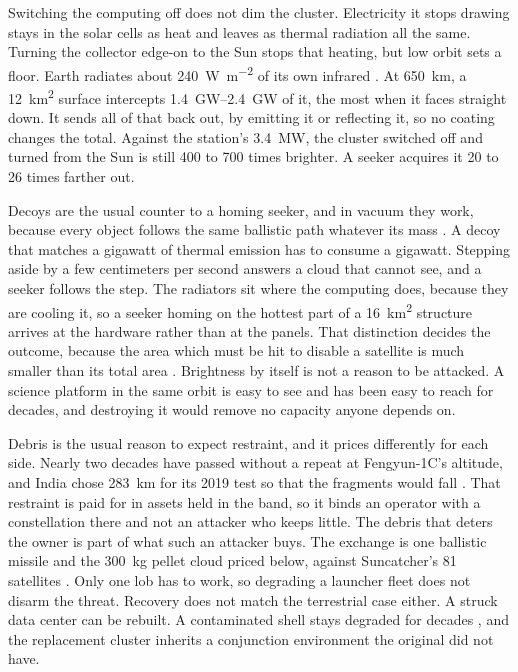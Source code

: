 \documentclass{article}
\begin{document}
Switching the computing off does not dim the cluster. Electricity it stops drawing stays in the solar cells as heat and leaves as thermal radiation all the same. Turning the collector edge-on to the Sun stops that heating, but low orbit sets a floor. Earth radiates about \SI{240}{\watt\per\square\meter} of its own infrared \cite{trenberth2009earth}. At \SI{650}{\kilo\meter}, a \SI{12}{\kilo\meter\squared} surface intercepts \SIrange{1.4}{2.4}{\giga\watt} of it, the most when it faces straight down. It sends all of that back out, by emitting it or reflecting it, so no coating changes the total. Against the station's \SI{3.4}{\mega\watt}, the cluster switched off and turned from the Sun is still 400 to 700 times brighter. A seeker acquires it 20 to 26 times farther out.

Decoys are the usual counter to a homing seeker, and in vacuum they work, because every object follows the same ballistic path whatever its mass \cite{nrc2012_bmd}. A decoy that matches a gigawatt of thermal emission has to consume a gigawatt. Stepping aside by a few centimeters per second answers a cloud that cannot see, and a seeker follows the step. The radiators sit where the computing does, because they are cooling it, so a seeker homing on the hottest part of a \SI{16}{\kilo\meter\squared} structure arrives at the hardware rather than at the panels. That distinction decides the outcome, because the area which must be hit to disable a satellite is much smaller than its total area \cite{wright2005_physics_space_security}. Brightness by itself is not a reason to be attacked. A science platform in the same orbit is easy to see and has been easy to reach for decades, and destroying it would remove no capacity anyone depends on.

Debris is the usual reason to expect restraint, and it prices differently for each side. Nearly two decades have passed without a repeat at Fengyun-1C's altitude, and India chose \SI{283}{\kilo\meter} for its 2019 test so that the fragments would fall \cite{carnegie2019_shakti}. That restraint is paid for in assets held in the band, so it binds an operator with a constellation there and not an attacker who keeps little. The debris that deters the owner is part of what such an attacker buys. The exchange is one ballistic missile and the \SI{300}{\kilo\gram} pellet cloud priced below, against Suncatcher's 81 satellites \cite{aguera2026_suncatcher}. Only one lob has to work, so degrading a launcher fleet does not disarm the threat. Recovery does not match the terrestrial case either. A struck data center can be rebuilt. A contaminated shell stays degraded for decades \cite{nasa_odqn2007_fengyun}, and the replacement cluster inherits a conjunction environment the original did not have.
\end{document}
